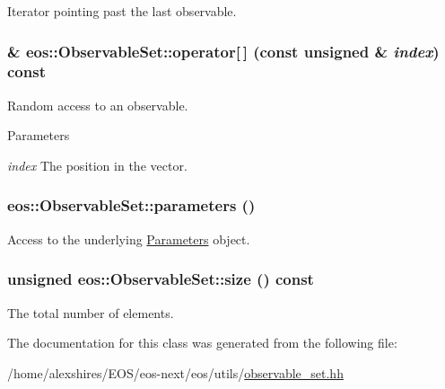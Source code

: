 Iterator pointing past the last observable. \hypertarget{classeos_1_1ObservableSet_adb47f7f0d77ea9f922aa5c5259695136}{
\subsubsection[{operator[]}]{\& eos::ObservableSet::operator\mbox{[}$\,$\mbox{]} (const unsigned \& {\em index}) const}}
\label{classeos_1_1ObservableSet_adb47f7f0d77ea9f922aa5c5259695136}
Random access to an observable.


\begin{DoxyParams}{Parameters}
\item[{\em index}]The position in the vector. \end{DoxyParams}
\hypertarget{classeos_1_1ObservableSet_a910264f5f626496138f8bae63dcbfa82}{
\subsubsection[{parameters}]{ eos::ObservableSet::parameters ()}}
\label{classeos_1_1ObservableSet_a910264f5f626496138f8bae63dcbfa82}


Access to the underlying \hyperlink{classeos_1_1Parameters}{Parameters} object. \hypertarget{classeos_1_1ObservableSet_ad14948c8f2421fc718f6ede0d9089cb0}{
\subsubsection[{size}]{\setlength{\rightskip}{0pt plus 5cm}unsigned eos::ObservableSet::size () const}}
\label{classeos_1_1ObservableSet_ad14948c8f2421fc718f6ede0d9089cb0}


The total number of elements. 

The documentation for this class was generated from the following file:\begin{DoxyCompactItemize}
\item 
/home/alexshires/EOS/eos-\/next/eos/utils/\hyperlink{observable__set_8hh}{observable\_\-set.hh}\end{DoxyCompactItemize}
